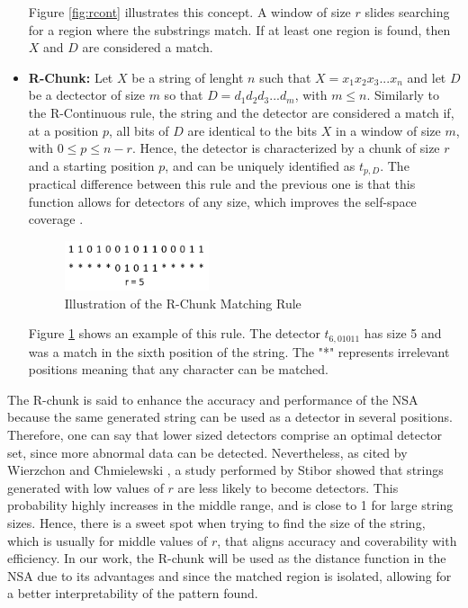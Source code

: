 \begin{itemize}
	Figure \ref{fig:rcont} illustrates this concept. A window of size \(r\) slides searching for a region where the substrings match. If at least one region is found, then \(X\) and \(D\) are considered a match.
    
    \item \textbf{R-Chunk:} Let \(X\) be a string of lenght \(n\) such that \(X = x_1 x_2 x_3...x_n\) and let \(D\) be a dectector of size \(m\) so that \(D = d_1 d_2 d_3...d_m\), with \( m \leq n\). Similarly to the R-Continuous rule, the string and the detector are considered a match if, at a position \(p\), all bits of \(D\) are identical to the bits \(X\) in a window of size \(m\), with \(0 \leq p \leq n - r\).  Hence, the detector is characterized by a chunk of size \(r\) and a starting position \(p\), and can be uniquely identified as \(t_{p, D}\). The practical difference between this rule and the previous one is that this function allows for detectors of any size, which improves the self-space coverage \cite{ICBook2009}.
    
	\begin{figure}[!h]
		\centering
		\includegraphics[width=0.4\textwidth, keepaspectratio]{img/rchunk.png}
		\caption{Illustration of the R-Chunk Matching Rule}
		\label{fig:rchunk}
	\end{figure}

	Figure \ref{fig:rchunk} shows an example of this rule. The detector \(t_{6, 01011}\) has size 5 and was a match in the sixth position of the string. The "*" represents irrelevant positions meaning that any character can be matched. 
\end{itemize}

The R-chunk is said to enhance the accuracy and performance of the NSA \cite{EffectBinaryRule2003} because the same generated string can be used as a detector in several positions. Therefore, one can say that lower sized detectors comprise an optimal detector set, since more abnormal data can be detected. Nevertheless, as cited by Wierzchon and Chmielewski \cite{HybridNSA2012}, a study performed by Stibor showed that strings generated with low values of \(r\) are less likely to become detectors. This probability highly increases in the middle range, and is close to 1 for large string sizes. Hence, there is a sweet spot when trying to find the size of the string, which is usually for middle values of \(r\), that aligns accuracy and coverability with efficiency. In our work, the R-chunk will be used as the distance function in the NSA due to its advantages and since the matched region is isolated, allowing for a better interpretability of the pattern found.

